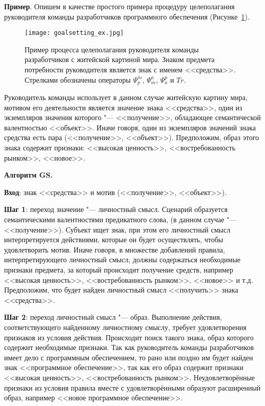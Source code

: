 \textbf{Пример}. Опишем в качестве простого примера процедуру целеполагания руководителя команды разработчиков программного обеспечения (Рисунке~\ref{fg:goalsetting_ex}).

\begin{figure}[h]
	\centering
	\texttt{[image: goalsetting\_ex.jpg]}
	\caption[]{Пример процесса целеполагания руководителя команды разработчиков с житейской картиной мира. Знаком предмета потребности руководителя является знак с именем <<средства>>. Стрелками обозначены операторы $\Psi_p^m$, $\Psi_m^a$, $\Psi_a^p$ и $Tr$.}
	\label{fg:goalsetting_ex}
\end{figure}

Руководитель команды использует в данном случае житейскую картину мира, мотивом его деятельности является значение знака <<средства>>, один из экземпляров значения которого "--- <<получение>>, обладающее семантической валентностью <<объект>>. Иначе говоря, один из экземпляров значений знака средства есть пара (<<получение>>, <<объект>>). Предположим, образ этого знака содержит признаки: <<высокая ценность>>, <<востребованность рынком>>, <<новое>>.

\textbf{Алгоритм GS.}

\textbf{Вход}: знак <<средства>> и мотив (<<получение>>, <<объект>>).

\textbf{Шаг 1}: переход значение "--- личностный смысл. Сценарий образуется семантическими валентностями предикатного слова, (в данном случае "--- <<получение>>). Субъект ищет знак, при этом его личностный смысл интерпретируется действиями, которые он будет осуществлять, чтобы удовлетворить мотив. Иначе говоря, в множестве добавлений правила, интерпретирующего личностный смысл, должны содержаться необходимые признаки предмета, за который происходит получение средств, например <<высокая ценность>>, <<востребованность рынком>>, <<новое>> и т.д. Предположим, что будет найден личностный смысл <<получить>> знака <<средства>>.

\textbf{Шаг 2}: переход личностный смысл "--- образ. Выполнение действия, соответствующего найденному личностному смыслу, требует удовлетворения признаков из условия действия. Происходит поиск такого знака, образ которого содержит необходимые признаки. Так как руководитель команды разработчиков имеет дело с программным обеспечением, то рано или поздно им будет найден знак <<программное обеспечение>>, так как его образ содержит признаки <<высокая ценность>>, <<востребованность рынком>>. Неудовлетворённые признаки из условия правила вместе с удовлетворёнными образуют расширенный образ, например <<новое программное обеспечение>>.

